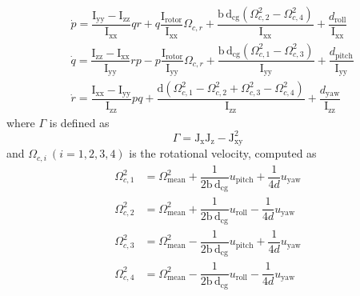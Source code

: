 \documentclass[3p]{elsarticle}
\begin{document}
\begin{align}
&\dot p = \dfrac{\mathrm{I}_{\text{yy}} - \mathrm{I}_{\text{zz}}}
{\mathrm{I}_{\text{xx}}} qr + q \dfrac{\mathrm{I}_{\text{rotor}}}
{\mathrm{I}_{\text{xx}}}\Omega_{c, r} + \dfrac{\mathrm{b\,d}_{\text{cg}} (\Omega_{c, 2}^2 - \Omega_{c, 4}^2)}{\mathrm{I}
_{\text{xx}}} + \dfrac{d_{\text{roll}}}{\mathrm{I}_{\text{xx}}}
\\
&\dot q = \dfrac{\mathrm{I}_{\text{zz}} - 
\mathrm{I}_{\text{xx}}}{\mathrm{I}_{\text{yy}}} rp -
p \dfrac{\mathrm{I}_{\text{rotor}}}{\mathrm{I}_{\text{yy}}}\Omega_{c, r} + 
\dfrac{\mathrm{b\,d}_{\text{cg}} (\Omega_{c, 1}^2 - \Omega_{c, 3}^2)}{\mathrm{I}_{\text{yy}}} +
\dfrac{d_{\text{pitch}}}{\mathrm{I}_{\text{yy}}}
\\
&\dot r = \dfrac{\mathrm{I}_{\text{xx}} -
\mathrm{I}_{\text{yy}}}{\mathrm{I}_{\text{zz}}} pq 
+  \dfrac{\mathrm{d} (\Omega_{c, 1}^2 - \Omega_{c, 2}^2 + \Omega_{c, 3}^2 - \Omega_{c, 4}^2)}{\mathrm{I}_{\text{zz}}} 
+ \dfrac{d_{\text{yaw}}}{\mathrm{I}_{\text{zz}}}
\end{align}
where $\Gamma$ is defined as
\begin{equation}
    \Gamma = \mathrm{J}_{\text{x}}\mathrm{J}_{\text{z}} - \mathrm{J}_{\text{xy}}^2
\end{equation}
and $\Omega_{c, i}~(i=1, 2, 3, 4)$ is the rotational velocity, computed as
 \begin{align}
    \Omega_{c, 1}^2 &= \Omega_{\text{mean}}^2 + \dfrac{1}{2\mathrm{b\,d}_{\text{cg}}}u_{\text{pitch}} + \dfrac{1}{4d}u_{\text{yaw}} \\
    \Omega_{c, 2}^2 &= \Omega_{\text{mean}}^2 + \dfrac{1}{2\mathrm{b\,d}_{\text{cg}}}u_{\text{roll}} - \dfrac{1}{4d}u_{\text{yaw}}\\
    \Omega_{c, 3}^2 &= \Omega_{\text{mean}}^2 - \dfrac{1}{2\mathrm{b\,d}_{\text{cg}}}u_{\text{pitch}} + \dfrac{1}{4d}u_{\text{yaw}} \\
    \Omega_{c, 4}^2 &= \Omega_{\text{mean}}^2 - \dfrac{1}{2\mathrm{b\,d}_{\text{cg}}}u_{\text{roll}} - \dfrac{1}{4d}u_{\text{yaw}}
\end{align}
\end{document}
